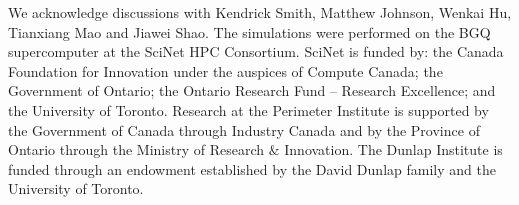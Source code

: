 We acknowledge discussions with Kendrick Smith, Matthew Johnson, Wenkai Hu, Tianxiang Mao and Jiawei Shao.
The simulations were performed on the BGQ supercomputer 
at the SciNet HPC Consortium.
SciNet is funded by: the Canada Foundation for Innovation under the auspices 
of Compute Canada;
the Government of Ontario; the Ontario Research Fund -- Research Excellence;
and the University of Toronto.
Research at the Perimeter Institute is supported by the Government of Canada through Industry Canada and by the 
Province of Ontario through the Ministry of Research $\&$ Innovation. 
The Dunlap Institute is funded through an endowment
established by the David Dunlap family and the University of Toronto.
